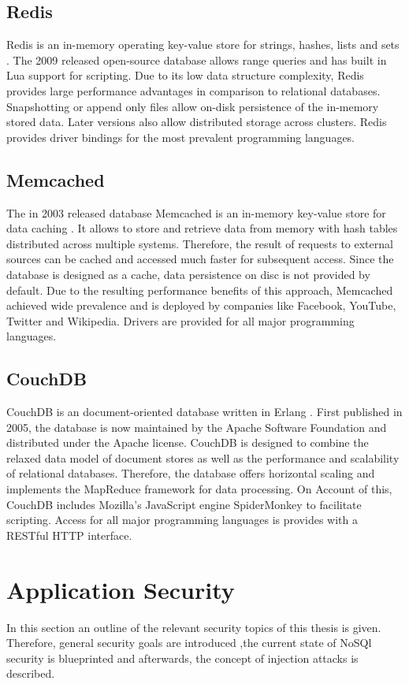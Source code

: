 \subsection{Redis}
Redis is an in-memory operating key-value store for strings, hashes, lists and sets \cite{Sanfilippo:2016}. The 2009 released open-source database allows range queries and has built in Lua support for scripting. Due to its low data structure complexity, Redis provides large performance advantages in comparison to relational databases. Snapshotting or append only files allow on-disk persistence of the in-memory stored data. Later versions also allow distributed storage across clusters. Redis provides driver bindings for the most prevalent programming languages.

\subsection{Memcached}
The in 2003 released database Memcached is an in-memory key-value store for data caching \cite{Dormando:2015}. It allows to store and retrieve data from memory with hash tables distributed across multiple systems. Therefore, the result of requests to external sources can be cached and accessed much faster for subsequent access. Since the database is designed as a cache, data persistence on disc is not provided by default. Due to the resulting performance benefits of this approach, Memcached achieved wide prevalence and is deployed by companies like Facebook, YouTube, Twitter and Wikipedia. Drivers are provided for all major programming languages.


\subsection{CouchDB}
CouchDB is an document-oriented database written in Erlang \cite{Anderson:2010}. First published in 2005, the database is now maintained by the Apache Software Foundation and distributed under the Apache license. CouchDB is designed to combine the relaxed data model of document stores as well as the performance and scalability of relational databases. Therefore, the database offers horizontal scaling and implements the MapReduce framework for data processing. On Account of this, CouchDB includes Mozilla's JavaScript engine SpiderMonkey to facilitate scripting. Access for all major programming languages is provides with a RESTful HTTP interface. 

\section{Application Security}
In this section an outline of the relevant security topics of this thesis is given. Therefore, general security goals are introduced ,the current state of NoSQl security is blueprinted and afterwards, the concept of injection attacks is described.

